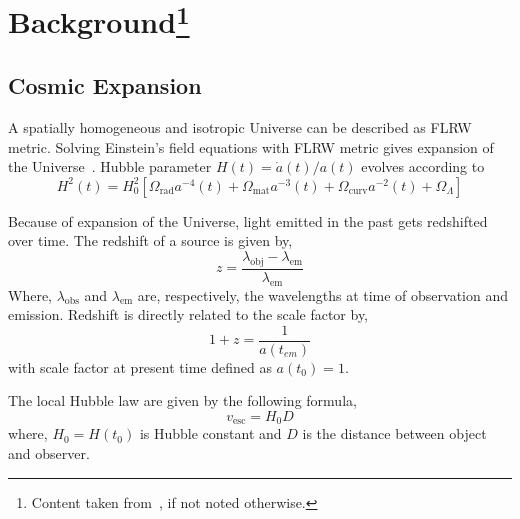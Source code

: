 \section[Background]{Background\footnote{Content taken from~\cite{manual}, if not noted otherwise.}}
\subsection{Cosmic Expansion}
A spatially homogeneous and isotropic Universe can be described as FLRW metric. Solving Einstein's field equations with FLRW metric gives expansion of the Universe~\cite{TEU}. Hubble parameter $H(t)=\dot{a}(t)/a(t)$ evolves according to
\begin{equation}
   H^2(t) = H_0^2 \left[ \Omega_\text{rad} a^{-4}(t) + \Omega_\text{mat}a^{-3}(t) + \Omega_\text{curv}a^{-2} (t) + \Omega_\Lambda \right]
\end{equation}

Because of expansion of the Universe, light emitted in the past gets redshifted over time. The redshift of a source is given by,
\begin{equation}
   z=\frac{\lambda_\text{obj}-\lambda_\text{em}}{\lambda_\text{em}}
\label{math:z}
\end{equation}
\noindent
Where, $\lambda_\text{obs}$ and $\lambda_\text{em}$ are, respectively, the wavelengths at time of observation and emission.
Redshift is directly related to the scale factor by,
\begin{equation}
1+z=\frac{1}{a(t_{em})}
\end{equation}
with scale factor at present time defined as $a(t_0) = 1$.

The local Hubble law are given by the following formula,\\
 \begin{equation}
    v_\text{esc}=H_{0}D
 \label{Hubble}
 \end{equation}
 where, $H_{0} = H(t_0)$ is Hubble constant and $D$ is the distance between object and observer.
  
